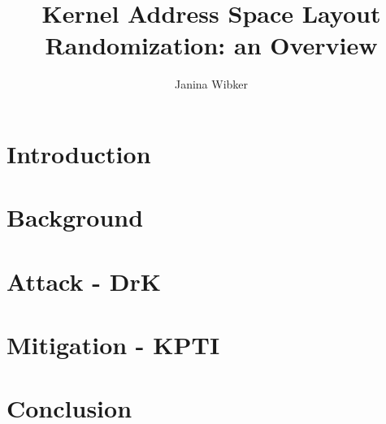 \documentclass[10pt,twocolumn,a4paper]{article}
\author{Janina Wibker}
\begin{document}
\title{ Kernel Address Space Layout Randomization: an Overview }

\newcommand{\todo}[1]{{\texttt{[#1]}}}
\newcommand{\code}[1]{{\lstinline[basicstyle=\ttfamily]{#1}}}

\maketitle

\begin{abstract}

\end{abstract}

\section{Introduction}\label{sec:introduction}



\section{Background}\label{sec:background}



\section{Attack - DrK}\label{sec:drk}



\section{Mitigation - KPTI}\label{sec:kpti}



\section{Conclusion}\label{sec:conclusion}





\end{document}
